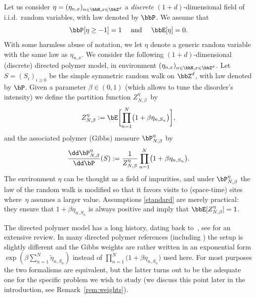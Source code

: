 Let us consider $\eta=(\eta_{n,x})_{n\in \bbN, x\in \bbZ^d}$ a \emph{discrete} $(1+d)$-dimensional field of i.i.d.\ random variables, with law denoted by $\bbP$.
We assume that
\begin{equation} \label{standard}
\bbP[\eta \ge -1]=1 \quad \text{ and } \quad \bbE[\eta]=0.
\end{equation}
With some harmless abuse of notation, we let $\eta$ denote a generic random variable with the same law as $\eta_{n,x}$.
We consider the following $(1+d)$-dimensional (discrete) directed polymer model, in environment $(\eta_{n,x})_{n\in \bbN, x\in \bbZ^d}$.
Let $S=(S_i)_{i\geq 0}$ be the simple symmetric random walk on $\bbZ^d$, with law denoted by $\bP$.
Given a parameter $\beta\in (0,1)$ (which allows to tune the disorder's intensity) we define the partition function $Z^{\eta}_{N,\beta}$~by\vspace*{-3pt}\enlargethispage{.3\baselineskip}%
%
\begin{equation}
\label{def:Zn}
Z^{\eta}_{N,\beta}:= \bE\biggl[\prod_{n=1}^N \bigl(1+\beta \eta_{n,S_n} \bigr) \biggr],
\end{equation}
and the associated polymer (Gibbs) measure $\bP^{\eta}_{N,\beta}$ by\vspace*{-3pt}
\begin{equation}\label{polymers}
\frac{ \dd \bP^{\eta}_{N,\beta}}{\dd \bP}(S):=\frac{1}{Z^{\eta}_{N,\beta}} \prod_{n=1}^N \bigl(1+\beta \eta_{n,S_n} \bigr).
\end{equation}
The environment $\eta$ can be thought as a field of impurities, and under
$\bP^{\eta}_{N,\beta}$ the law of the random walk is modified so that it favors visits to (space-time) sites where~$\eta$ assumes a larger value. Assumptions \eqref{standard} are merely practical:
they ensure that $1+\beta \eta_{n,S_n}$ is always positive and imply that $\bbE [ Z^{\eta}_{N,\beta}]=1$.

The directed polymer model has a long history, dating back to~\cite{HH85}, see \cite{C17} for an extensive review. In many directed polymer references (including \cite{C17}) the setup is slightly different and the Gibbs weights are rather written in an exponential form $\exp(\beta \sum_{n=1}^{N} \tilde\eta_{n,S_n})$ instead of $\prod_{n=1}^N \bigl(1+\beta \eta_{n,S_n} \bigr)$ used here.
For most purposes the two formalisms are equivalent, but the latter turns out to be the adequate one for the specific problem we wish to study (we discuss this point later in the introduction, see Remark~\ref{rem:weights}).

